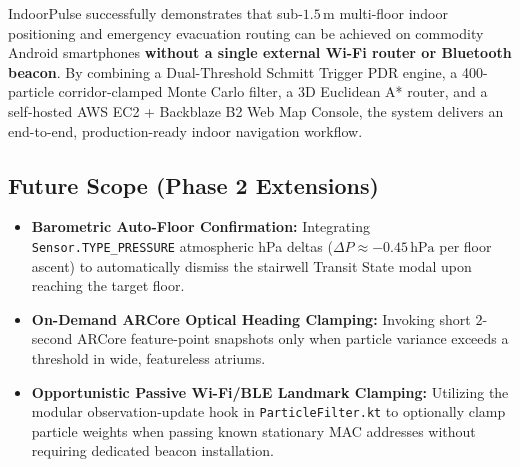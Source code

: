 \documentclass[11pt,a4paper]{article}
\begin{document}
IndoorPulse successfully demonstrates that sub-$1.5\,\text{m}$ multi-floor indoor positioning and emergency evacuation routing can be achieved on commodity Android smartphones \textbf{without a single external Wi-Fi router or Bluetooth beacon}. By combining a Dual-Threshold Schmitt Trigger PDR engine, a 400-particle corridor-clamped Monte Carlo filter, a 3D Euclidean A* router, and a self-hosted AWS EC2 + Backblaze B2 Web Map Console, the system delivers an end-to-end, production-ready indoor navigation workflow.

\subsection{Future Scope (Phase 2 Extensions)}
\begin{itemize}
    \item \textbf{Barometric Auto-Floor Confirmation:} Integrating \texttt{Sensor.TYPE\_PRESSURE} atmospheric hPa deltas ($\Delta P \approx -0.45\,\text{hPa}$ per floor ascent) to automatically dismiss the stairwell Transit State modal upon reaching the target floor.
    \item \textbf{On-Demand ARCore Optical Heading Clamping:} Invoking short $2$-second ARCore feature-point snapshots only when particle variance exceeds a threshold in wide, featureless atriums.
    \item \textbf{Opportunistic Passive Wi-Fi/BLE Landmark Clamping:} Utilizing the modular observation-update hook in \texttt{ParticleFilter.kt} to optionally clamp particle weights when passing known stationary MAC addresses without requiring dedicated beacon installation.
\end{itemize}
\end{document}
